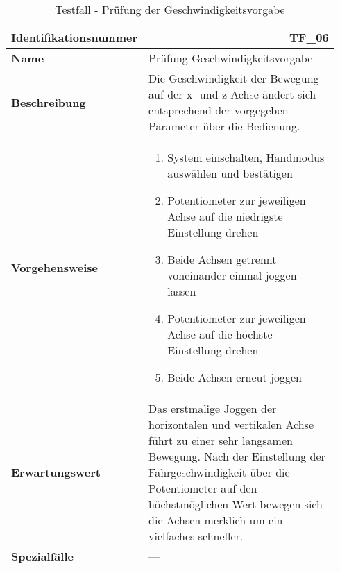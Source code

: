 \documentclass[../../../Bachelorarbeit.tex]{subfiles}
\begin{document}
\begin{table}[H]
    \centering
    \begin{tabular}{ p{0.34\linewidth}  p{0.6\linewidth} }
        \hline
        \textbf{Identifikationsnummer}  & \multicolumn{1}{r}{TF\_06} \\ \hline
        \textbf{Name}                   & Prüfung Geschwindigkeitsvorgabe \\
        \textbf{Beschreibung}           & Die Geschwindigkeit der Bewegung auf der x- und z-Achse ändert sich entsprechend der vorgegeben Parameter über die Bedienung. \\
        \textbf{Vorgehensweise}         &   {\begin{enumerate}[noitemsep,topsep=0pt,parsep=0pt,partopsep=0pt,leftmargin=*]
                                                \item System einschalten, Handmodus auswählen und bestätigen
                                                \item Potentiometer zur jeweiligen Achse auf die niedrigste Einstellung drehen
                                                \item Beide Achsen getrennt voneinander einmal joggen lassen
                                                \item Potentiometer zur jeweiligen Achse auf die höchste Einstellung drehen
                                                \item Beide Achsen erneut joggen
                                            \end{enumerate}} \\
        \textbf{Erwartungswert}         & Das erstmalige Joggen der horizontalen und vertikalen Achse führt zu einer sehr langsamen Bewegung. Nach der Einstellung der Fahrgeschwindigkeit über die Potentiometer auf den höchstmöglichen Wert bewegen sich die Achsen merklich um ein vielfaches schneller. \\
        \textbf{Spezialfälle}           & --- \\ \hline
    \end{tabular}
    \caption[\acs{tf} - Geschwindigkeitsvorgabe]{Testfall - Prüfung der Geschwindigkeitsvorgabe}
    \label{tab:my-table65}
\end{table}
\end{document}
